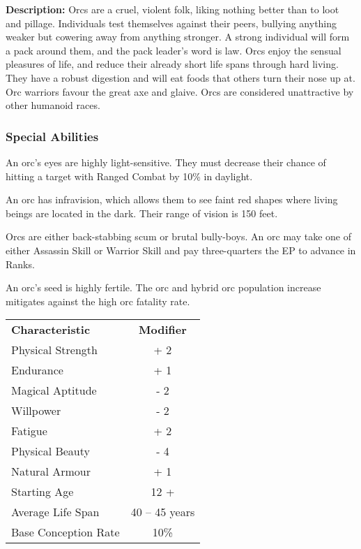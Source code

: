 \begin{multicols*}{3}
\textbf{Description:} Orcs are a cruel, violent folk, liking nothing
better than to loot and pillage. Individuals test themselves against
their peers, bullying anything weaker but cowering away from anything
stronger. A strong individual will form a pack around them, and the
pack leader's word is law. Orcs enjoy the sensual pleasures of life,
and reduce their already short life spans through hard living. They
have a robust digestion and will eat foods that others turn their nose
up at. Orc warriors favour the great axe and glaive. Orcs are
considered unattractive by other humanoid races.

\subsubsection{Special Abilities}

\begin{Enumerate}
\item
An orc's eyes are highly light-sensitive. They must decrease their
chance of hitting a target with Ranged Combat by 10\% in daylight.

\item
An orc has infravision, which allows them to see faint red shapes
where living beings are located in the dark. Their range of vision is
150 feet.

\item
Orcs are either back-stabbing scum or brutal bully-boys. An orc may
take one of either Assassin Skill or Warrior Skill and pay
three-quarters the EP to advance in Ranks.

\item
An orc's seed is highly fertile. The orc and hybrid orc population
increase mitigates against the high orc fatality rate.
\end{Enumerate}

\begin{tabularx}{\linewidth}{Xc}
\textbf{Characteristic} & \textbf{Modifier} \\
Physical Strength	& + 2 \\
Endurance		& + 1 \\
Magical Aptitude	& - 2 \\
Willpower		& - 2 \\
Fatigue			& + 2 \\
Physical Beauty		& - 4 \\
Natural Armour		& + 1 \\
Starting Age		& 12 + \\
Average Life Span	& 40 -- 45 years \\
Base Conception Rate	& 10\% \\
\end{tabularx}


\end{multicols*}
